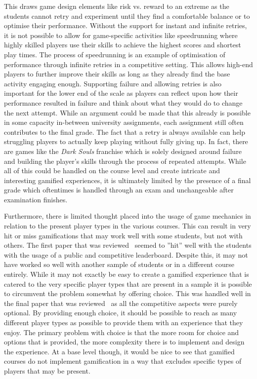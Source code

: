 This draws game design elements like risk vs. reward to an extreme as the students cannot retry and experiment until they find a comfortable balance or to optimise their performance. Without the support for instant and infinite retries, it is not possible to allow for game-specific activities like speedrunning where highly skilled players use their skills to achieve the highest scores and shortest play times. The process of speedrunning is an example of optimisation of performance through infinite retries in a competitive setting. This allows high-end players to further improve their skills as long as they already find the base activity engaging enough. Supporting failure and allowing retries is also important for the lower end of the scale as players can reflect upon how their performance resulted in failure and think about what they would do to change the next attempt. While an argument could be made that this already is possible in some capacity in-between university assignments, each assignment still often contributes to the final grade. The fact that a retry is always available can help struggling players to actually keep playing without fully giving up. In fact, there are games like the \emph{Dark Souls} franchise which is solely designed around failure and building the player's skills through the process of repeated attempts. While all of this could be handled on the course level and create intricate and interesting gamified experiences, it is ultimately limited by the presence of a final grade which oftentimes is handled through an exam and unchangeable after examination finishes. 


Furthermore, there is limited thought placed into the usage of game mechanics in relation to the present player types in the various courses. This can result in very hit or miss gamifications that may work well with some students, but not with others. The first paper that was reviewed~\cite{panagiotis2016climbing} seemed to ''hit'' well with the students with the usage of a public and competitive leaderboard. Despite this, it may not have worked so well with another sample of students or in a different course entirely. While it may not exactly be easy to create a gamified experience that is catered to the very specific player types that are present in a sample it is possible to circumvent the problem somewhat by offering choice. This was handled well in the final paper that was reviewed~\cite{mozelius2014game} as all the competitive aspects were purely optional. By providing enough choice, it should be possible to reach as many different player types as possible to provide them with an experience that they enjoy. The primary problem with choice is that the more room for choice and options that is provided, the more complexity there is to implement and design the experience. At a base level though, it would be nice to see that gamified courses do not implement gamification in a way that excludes specific types of players that may be present.